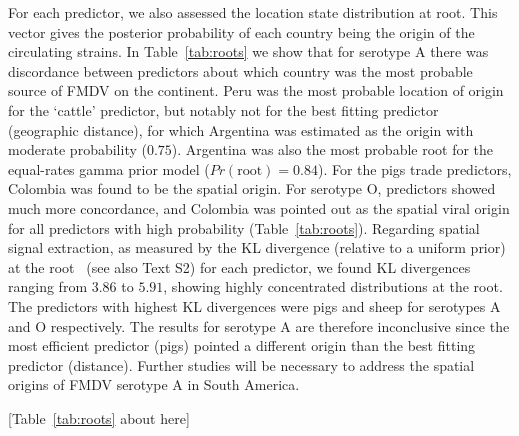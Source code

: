 \documentclass[10pt]{article}
\begin{document}
For each predictor, we also assessed the location state distribution at root. 
This vector gives the posterior probability of each country being the origin of the circulating strains.
In Table~\ref{tab:roots} we show that for serotype A there was discordance between predictors about which country was the most probable source of FMDV on the continent.
Peru was the most probable location of origin for the `cattle' predictor, but notably not for the best fitting predictor (geographic distance), for which Argentina was estimated as the origin with moderate probability ($0.75$).
Argentina was also the most probable root for the equal-rates gamma prior model ($Pr(\text{root})=0.84$).
For the pigs trade predictors, Colombia was found to be the spatial origin.
For serotype O, predictors showed much more concordance, and Colombia was pointed out as the spatial viral origin for all predictors with high probability (Table~\ref{tab:roots}).
Regarding spatial signal extraction, as measured by the KL divergence (relative  to a uniform prior) at the root~\cite{roots} (see also Text S2) for each predictor, we found KL divergences ranging from $3.86$ to $5.91$, showing highly concentrated distributions at the root. 
The predictors with highest KL divergences  were pigs and sheep for serotypes A and O respectively.
The results for serotype A are therefore inconclusive since the most efficient predictor (pigs) pointed a different origin than the best fitting predictor (distance).
Further studies will be necessary to address the spatial origins of FMDV serotype A in South America.

\begin{center}
 [Table~\ref{tab:roots} about here]
\end{center}
\end{document}
